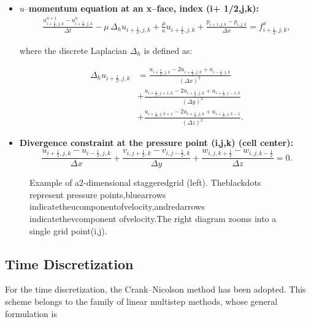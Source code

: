 \documentclass[12pt]{article}
\begin{document}
\begin{itemize}
    \item  $u$–\textbf{momentum equation at an x–face, index (i+ 1/2,j,k):}  \begin{align}
            \frac{u^{n+1}_{i+\frac{1}{2},j,k} - u^n_{i+\frac{1}{2},j,k}}{\Delta t} 
            - \mu \, \Delta_h u_{i+\frac{1}{2},j,k} 
            + \frac{\mu}{\kappa} u_{i+\frac{1}{2},j,k} 
            + \frac{p_{i+1,j,k} - p_{i,j,k}}{\Delta x} 
            = f^x_{i+\frac{1}{2},j,k},
            \end{align}
            
            where the discrete Laplacian \(\Delta_h\) is defined as:
            
            \begin{align}
            \Delta_h u_{i+\frac{1}{2},j,k} &= 
            \frac{u_{i+\frac{3}{2},j,k} - 2 u_{i+\frac{1}{2},j,k} + u_{i-\frac{1}{2},j,k}}{(\Delta x)^2} \\
            &+ \frac{u_{i+\frac{1}{2},j+1,k} - 2 u_{i+\frac{1}{2},j,k} + u_{i+\frac{1}{2},j-1,k}}{(\Delta y)^2} \\
            &+ \frac{u_{i+\frac{1}{2},j,k+1} - 2 u_{i+\frac{1}{2},j,k} + u_{i+\frac{1}{2},j,k-1}}{(\Delta z)^2}.
        \end{align}
    
    \item \textbf{ Divergence constraint at the pressure point (i,j,k) (cell center):}
    \[
    \frac{u_{i+\frac{1}{2},j,k} - u_{i-\frac{1}{2},j,k}}{\Delta x} 
    + \frac{v_{i,j+\frac{1}{2},k} - v_{i,j-\frac{1}{2},k}}{\Delta y} 
    + \frac{w_{i,j,k+\frac{1}{2}} - w_{i,j,k-\frac{1}{2}}}{\Delta z} = 0.
    \]
\end{itemize}


\begin{figure}[h!]
    \centering
    \caption{ Example of a2-dimensional staggeredgrid (left). Theblackdots represent pressure
 points,bluearrows indicatetheucomponentofvelocity,andredarrows indicatethevcomponent
 ofvelocity.The right diagram zooms into a single grid point(i,j).}
    \label{fig:staggered-grid}
\end{figure}

\subsection{Time Discretization}
For the time discretization, the Crank--Nicolson method has been adopted. 
This scheme belongs to the family of linear multistep methods, whose general 
formulation is
\end{document}
